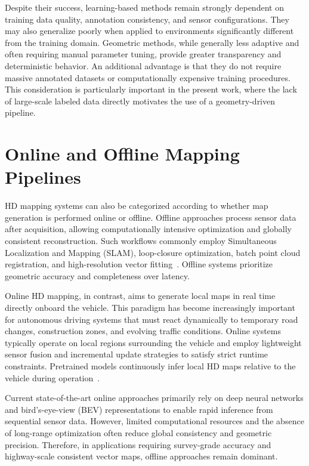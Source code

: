 Despite their success, learning-based methods remain strongly dependent on training data quality, annotation consistency, and sensor configurations. They may also generalize poorly when applied to environments significantly different from the training domain. Geometric methods, while generally less adaptive and often requiring manual parameter tuning, provide greater transparency and deterministic behavior. An additional advantage is that they do not require massive annotated datasets or computationally expensive training procedures. This consideration is particularly important in the present work, where the lack of large-scale labeled data directly motivates the use of a geometry-driven pipeline.

\section{Online and Offline Mapping Pipelines}
\label{sec:online_offline}

HD mapping systems can also be categorized according to whether map generation is performed online or offline. Offline approaches process sensor data after acquisition, allowing computationally intensive optimization and globally consistent reconstruction. Such workflows commonly employ Simultaneous Localization and Mapping (SLAM), loop-closure optimization, batch point cloud registration, and high-resolution vector fitting~\cite{eightpopularLidarandVisualSLAM}. Offline systems prioritize geometric accuracy and completeness over latency.

Online HD mapping, in contrast, aims to generate local maps in real time directly onboard the vehicle. This paradigm has become increasingly important for autonomous driving systems that must react dynamically to temporary road changes, construction zones, and evolving traffic conditions. Online systems typically operate on local regions surrounding the vehicle and employ lightweight sensor fusion and incremental update strategies to satisfy strict runtime constraints. Pretrained models continuously infer local HD maps relative to the vehicle during operation~\cite{li2022hdmapnetonlinehdmap}.

Current state-of-the-art online approaches primarily rely on deep neural networks and bird’s-eye-view (BEV) representations to enable rapid inference from sequential sensor data. However, limited computational resources and the absence of long-range optimization often reduce global consistency and geometric precision. Therefore, in applications requiring survey-grade accuracy and highway-scale consistent vector maps, offline approaches remain dominant.

